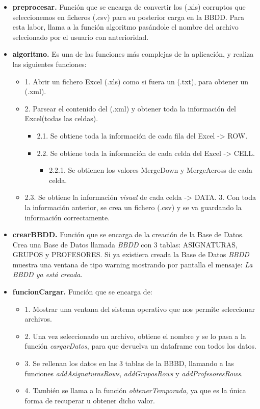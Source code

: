 \begin{itemize}

\item \textbf{preprocesar.} Función que se encarga de convertir los (.xls) corruptos que seleccionemos en ficheros (.csv)
para su posterior carga en la BBDD. Para esta labor, llama a la función algoritmo pasándole el nombre del archivo selecionado 
por el usuario con anterioridad.

\item \textbf{algoritmo.} Es una de las funciones más complejas de la aplicación, y realiza las siguientes funciones:
	\begin{itemize}
    \item 1. Abrir un fichero Excel (.xls) como si fuera un (.txt), para obtener un (.xml).
    \item 2. Parsear el contenido del (.xml) y obtener toda la información del Excel(todas las celdas).
       \begin{itemize} 
       \item 2.1. Se obtiene toda la información de cada fila del Excel -> ROW.
        \item 2.2. Se obtiene toda la información de cada celda del Excel -> CELL.
        	 \begin{itemize} 
              \item  2.2.1. Se obtienen los valores MergeDown y MergeAcross de cada celda.
            \end{itemize}
        \end{itemize}  
     \item   2.3. Se obtiene la información \emph{visual}  de cada celda -> DATA.
    3. Con toda la información anterior, se crea un fichero (.csv) y se va guardando la información correctamente.
    \end{itemize}
    

\item \textbf{crearBBDD.} Función que se encarga de la creación de la Base de Datos. Crea una Base de Datos llamada \emph{BBDD} con 3 tablas: ASIGNATURAS, GRUPOS y PROFESORES. Si ya existiera creada la Base de Datos \emph{BBDD} muestra una ventana de tipo warning mostrando por pantalla el mensaje: \emph{La BBDD ya está creada}.



\item \textbf{funcionCargar.} Función que se encarga de: 
	\begin{itemize}
     \item 1. Mostrar una ventana del sistema operativo que nos permite seleccionar archivos.
    \item  2. Una vez seleccionado un archivo, obtiene el nombre y se lo pasa a la función \emph{cargarDatos}, para que devuelva un dataframe con todos los datos.
     \item 3. Se rellenan los datos en las 3 tablas de la BBBD, llamando a las funciones \emph{addAsignaturasRows}, \emph{addGruposRows} y \emph{addProfesoresRows}. 
     \item 4. También se llama a la función \emph{obtenerTemporada}, ya que es la única forma de recuperar u obtener dicho valor.
	\end{itemize}


\end{itemize}
